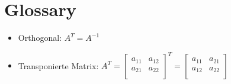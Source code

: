 \documentclass[a4paper]{scrartcl}
\begin{document}
\section{Glossary}
\begin{itemize}
  \item Orthogonal: $A^T = A^{-1}$
  \item Transponierte Matrix: $A^T = \begin{bmatrix}
  		a_{11}&a_{12}\\
		a_{21}&a_{22}\\
	\end{bmatrix}^T = \begin{bmatrix}
  		a_{11}&a_{21}\\
		a_{12}&a_{22}\\
	\end{bmatrix}$
\end{itemize}
\end{document}

